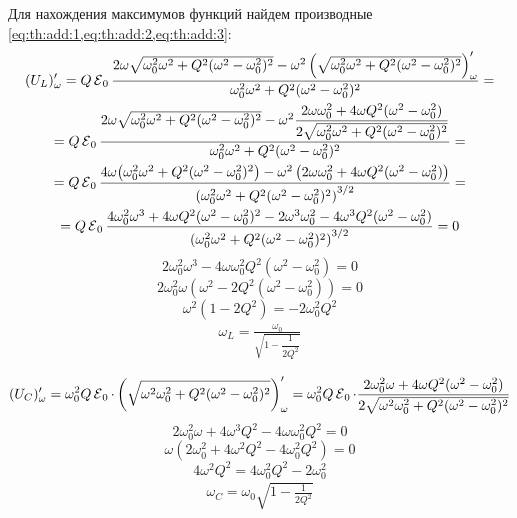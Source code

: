 Для нахождения максимумов функций найдем производные \cref{eq:th:add:1,eq:th:add:2,eq:th:add:3}:
\begin{multline*}
	(U_L)_\omega' 
	= 
	Q \operatorname{\mathcal{E}}_0 \frac{2 \omega \sqrt{\omega_0^2 \omega^2 + Q^2 (\omega^2 - \omega_0^2)^2} - \omega^2 \left(\sqrt{\omega_0^2 \omega^2 + Q^2 (\omega^2 - \omega_0^2)^2}\right)'_\omega}{\omega_0^2 \omega^2 + Q^2 (\omega^2 - \omega_0^2)^2}
	=\\=
	Q \operatorname{\mathcal{E}}_0 \frac{2 \omega \sqrt{\omega_0^2 \omega^2 + Q^2 (\omega^2 - \omega_0^2)^2} - \omega^2 \dfrac{2\omega\omega_0^2 + 4 \omega Q^2(\omega^2 - \omega_0^2)}{2\sqrt{\omega_0^2 \omega^2 + Q^2 (\omega^2 - \omega_0^2)^2}}}{\omega_0^2 \omega^2 + Q^2 (\omega^2 - \omega_0^2)^2}
	=\\=
	Q \operatorname{\mathcal{E}}_0 \frac{4 \omega \big(\omega_0^2 \omega^2 + Q^2 (\omega^2 - \omega_0^2)^2\big) - \omega^2 \left(2\omega\omega_0^2 + 4 \omega Q^2(\omega^2 - \omega_0^2)\right)}{\left(\omega_0^2 \omega^2 + Q^2 (\omega^2 - \omega_0^2)^2\right)^{3/2}}
	=\\=
	Q \operatorname{\mathcal{E}}_0 \frac{4 \omega_0^2 \omega^3 + 4 \omega Q^2 (\omega^2 - \omega_0^2)^2 - 2\omega^3\omega_0^2 - 4 \omega^3 Q^2(\omega^2 - \omega_0^2)}{\left(\omega_0^2 \omega^2 + Q^2 (\omega^2 - \omega_0^2)^2\right)^{3/2}}
	=
	0
\end{multline*}
\[2 \omega_0^2\omega^3 - 4 \omega \omega_0^2 Q^2 (\omega^2 - \omega_0^2) = 0\]
\[2 \omega_0^2 \omega \left( \omega^2 - 2Q^2 (\omega^2 - \omega_0^2) \right) = 0\]
\[\omega^2(1 - 2 Q^2) = - 2 \omega_0^2 Q^2\]
\begin{align} \label{eq:th:add:5}
	\boxed{\omega_L = \frac{\omega_0}{\sqrt{1 - \dfrac{1}{2Q^2}}}}
\end{align}

\[(U_C)_\omega' 
= 
\omega_0^2 Q \operatorname{\mathcal{E}}_0 \cdot\left(\sqrt{\omega^2 \omega_0^2 + Q^2 (\omega^2 - \omega_0^2)^2}\right)'_\omega 
= 
\omega_0^2 Q \operatorname{\mathcal{E}}_0 \cdot \frac{2 \omega_0^2 \omega + 4\omega Q^2(\omega^2 - \omega_0^2) }{2 \sqrt{\omega^2 \omega_0^2 + Q^2 (\omega^2 - \omega_0^2)^2}}\]
\[2 \omega_0^2\omega + 4 \omega^3 Q^2 - 4 \omega \omega_0^2 Q^2 = 0\]
\[\omega(2 \omega^2_0 + 4 \omega^2 Q^2 - 4 \omega_0^2 Q^2) = 0\]
\[4 \omega^2 Q^2 = 4 \omega_0^2 Q^2 - 2\omega_0^2\]
\begin{align} \label{eq:th:add:4}
	\boxed{\omega_C = \omega_0\sqrt{1 - \frac{1}{2Q^2}}}
\end{align}

